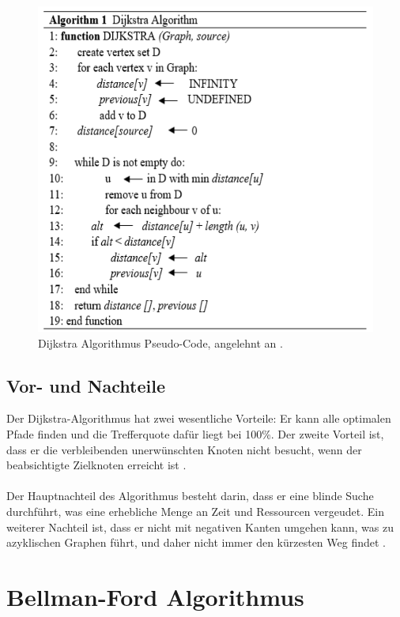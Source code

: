 \begin{figure}[H]
	\centering
	\includegraphics[width=1.0\textwidth]{images/Dijkstra_pseudoCode.PNG}
	\caption{Dijkstra Algorithmus Pseudo-Code, angelehnt an \cite{Abusalim2020}.}
	\label{fig:Dijkstra Pseudo-Code}
\end{figure}

\subsection{Vor- und Nachteile}
Der Dijkstra-Algorithmus hat zwei wesentliche Vorteile: Er kann alle optimalen Pfade finden und die Trefferquote dafür liegt
bei 100\%. Der zweite Vorteil ist, dass er die verbleibenden unerwünschten Knoten nicht besucht, wenn der beabsichtigte Zielknoten erreicht
ist \cite{Zhou:19,Abusalim2020}.
\\ \\
Der Hauptnachteil des Algorithmus besteht darin, dass er eine blinde Suche durchführt, was eine erhebliche Menge an Zeit und Ressourcen vergeudet. 
Ein weiterer Nachteil ist, dass er nicht mit negativen Kanten umgehen kann, was zu azyklischen Graphen führt, und daher nicht immer den kürzesten 
Weg findet \cite{Mukhlif2020}.


\section{Bellman-Ford Algorithmus}
\label{Bellman-Ford-Algorithmus}

